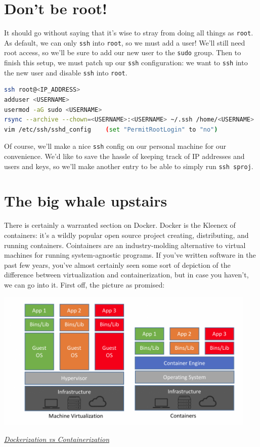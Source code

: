 \documentclass[11pt, twoside, reqno]{book}
\begin{document}
\section{Don't be root!}

It should go without saying that it's wise to stray from doing all things as \texttt{root}. As default, we can only \texttt{ssh} into \texttt{root}, so we must add a user! We'll still need root access, so we'll be sure to add our new user to the \texttt{sudo} group. Then to finish this setup, we must patch up our \texttt{ssh} configuration: we want to \texttt{ssh} into the new user and disable \texttt{ssh} into \texttt{root}.

\begin{lstlisting}[language=sh]
ssh root@<IP_ADDRESS>
adduser <USERNAME>
usermod -aG sudo <USERNAME> 
rsync --archive --chown=<USERNAME>:<USERNAME> ~/.ssh /home/<USERNAME> 
vim /etc/ssh/sshd_config    (set "PermitRootLogin" to "no")
\end{lstlisting}

Of course, we'll make a nice \texttt{ssh} config on our personal machine for our convenience. We'd like to save the hassle of keeping track of IP addresses and users and keys, so we'll make another entry to be able to simply run \texttt{ssh sproj}.

\section{The big whale upstairs}

There is certainly a warranted section on Docker. Docker is the Kleenex of containers: it's a wildly popular open source project creating, distributing, and running containers. Cointainers are an industry-molding alternative to virtual machines for running system-agnostic programs. If you've written software in the past few years, you've almost certainly seen some sort of depiction of the difference between virtualization and containerization, but in case you haven't, we can go into it. First off, the picture as promised:

\begin{center}
  \includegraphics[width=125mm,scale=0.5]{dockerImage.png}

  {\small \href{https://blog.netapp.com/wp-content/uploads/2016/03/Screen-Shot-2018-03-20-at-9.24.09-AM-1024x548.png}{\textit{Dockerization vs Containerization}}}
\end{center}
\end{document}
